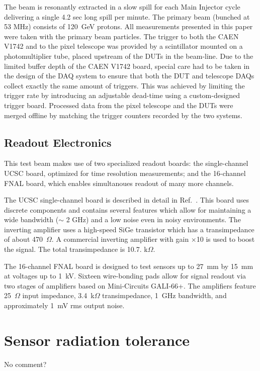 \documentclass[preprint,1p]{elsarticle}
\begin{document}
The beam is resonantly extracted in a slow spill for each Main Injector cycle
delivering a single 4.2 sec long spill per minute. The primary beam (bunched at
53 MHz) consists of 120~GeV protons. All measurements presented in this paper
were taken with the primary beam particles. The trigger to both the CAEN V1742
and to the pixel telescope was provided by a scintillator mounted on a
photomultiplier tube, placed upstream of the DUTs in the beam-line. Due to the
limited buffer depth of the CAEN V1742 board, special care had to be taken in
the design of the DAQ system to ensure that both the DUT and telescope DAQs
collect exactly the same amount of triggers. This was achieved by limiting the
trigger rate by introducing an adjustable dead-time using a custom-designed
trigger board. Processed data from the pixel telescope and the DUTs were
merged offline by matching the trigger counters recorded by the two systems.

\subsection{Readout Electronics}
This test beam makes use of two specialized readout boards: the single-channel UCSC board, optimized for time resolution measurements; and the 16-channel FNAL board, which enables simultanoues readout of many more channels.

The UCSC single-channel board is described in detail in
Ref.~\cite{Cartiglia201783}. This board uses discrete components and contains
several features which allow for maintaining a wide bandwidth ($\sim$ 2 GHz) and a
low noise even in noisy environments. The inverting amplifier uses a high-speed
SiGe transistor which has a transimpedance of about 470~$\Omega$. A commercial
inverting amplifier with gain $\times$10 is used to boost the signal. The total transimpedance is 10.7.
k$\Omega$.

The 16-channel FNAL board is designed to test sensors up to 27~mm
by 15~mm at voltages up to 1~kV. Sixteen wire-bonding pads allow for signal readout via two stages of amplifiers based on Mini-Circuits GALI-66+. The amplifiers feature 25~$\Omega$ input impedance, 3.4~k$\Omega$ transimpedance, 1~GHz bandwidth, and approximately 1~mV rms output noise.

\section{Sensor radiation tolerance}
\label{sec:irradiationStudies}
{\color{red} No comment?}
\end{document}
